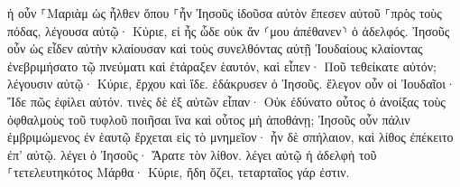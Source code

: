 \documentclass{openreader}
\begin{document}
ἡ οὖν ⸀Μαριὰμ ὡς ἦλθεν ὅπου ⸀ἦν Ἰησοῦς ἰδοῦσα αὐτὸν ἔπεσεν αὐτοῦ ⸀πρὸς τοὺς πόδας, λέγουσα αὐτῷ· Κύριε, εἰ ἦς ὧδε οὐκ ἄν ⸂μου ἀπέθανεν⸃ ὁ ἀδελφός. 
Ἰησοῦς οὖν ὡς εἶδεν αὐτὴν κλαίουσαν καὶ τοὺς συνελθόντας αὐτῇ Ἰουδαίους κλαίοντας ἐνεβριμήσατο τῷ πνεύματι καὶ ἐτάραξεν ἑαυτόν, 
καὶ εἶπεν· Ποῦ τεθείκατε αὐτόν; λέγουσιν αὐτῷ· Κύριε, ἔρχου καὶ ἴδε. 
ἐδάκρυσεν ὁ Ἰησοῦς. 
ἔλεγον οὖν οἱ Ἰουδαῖοι· Ἴδε πῶς ἐφίλει αὐτόν. 
τινὲς δὲ ἐξ αὐτῶν εἶπαν· Οὐκ ἐδύνατο οὗτος ὁ ἀνοίξας τοὺς ὀφθαλμοὺς τοῦ τυφλοῦ ποιῆσαι ἵνα καὶ οὗτος μὴ ἀποθάνῃ; 
Ἰησοῦς οὖν πάλιν ἐμβριμώμενος ἐν ἑαυτῷ ἔρχεται εἰς τὸ μνημεῖον· ἦν δὲ σπήλαιον, καὶ λίθος ἐπέκειτο ἐπ’ αὐτῷ. 
λέγει ὁ Ἰησοῦς· Ἄρατε τὸν λίθον. λέγει αὐτῷ ἡ ἀδελφὴ τοῦ ⸀τετελευτηκότος Μάρθα· Κύριε, ἤδη ὄζει, τεταρταῖος γάρ ἐστιν. 
\end{document}
